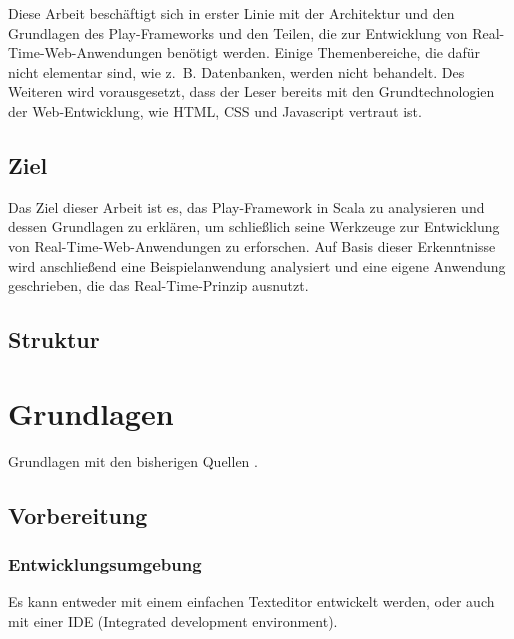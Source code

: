 \documentclass[draft=false
              ,paper=a4
              ,twoside=false
              ,fontsize=11pt
              ,headsepline
              ,BCOR10mm
              ,DIV11
              ]{scrbook}
\begin{document}
Diese Arbeit beschäftigt sich in erster Linie mit der Architektur und den Grundlagen des Play-Frameworks und den Teilen, die zur Entwicklung von Real-Time-Web-Anwendungen benötigt werden.
Einige Themenbereiche, die dafür nicht elementar sind, wie z.~B. Datenbanken, werden nicht behandelt.
Des Weiteren wird vorausgesetzt, dass der Leser bereits mit den Grundtechnologien der Web-Entwicklung, wie HTML, CSS und Javascript vertraut ist.



\section{Ziel} %
\label{sec:ziel}

Das Ziel dieser Arbeit ist es, das Play-Framework in Scala zu analysieren und dessen Grundlagen zu erklären, um schließlich seine Werkzeuge zur Entwicklung von Real-Time-Web-Anwendungen zu erforschen.
Auf Basis dieser Erkenntnisse wird anschließend eine Beispielanwendung analysiert und eine eigene Anwendung geschrieben, die das Real-Time-Prinzip ausnutzt.





\section{Struktur} %
\label{sec:struktur}





\chapter{Grundlagen} %
\label{cha:grundlagen}

Grundlagen mit den bisherigen Quellen \citealt{hilton2013}.


\section{Vorbereitung} %
\label{sec:vorbereitung}

\subsection{Entwicklungsumgebung} %
\label{sub:entwicklungsumgebung}

Es kann entweder mit einem einfachen Texteditor entwickelt werden, oder auch mit einer IDE (Integrated development environment).
\end{document}

